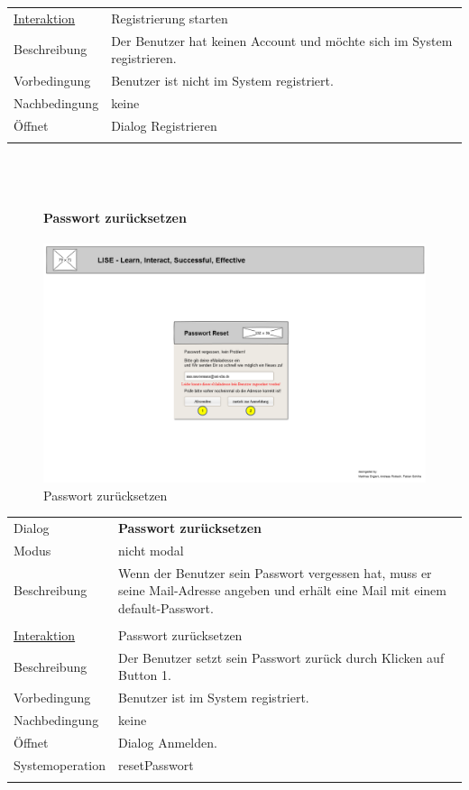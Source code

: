 \documentclass[12pt,a4paper]{article}
\begin{document}
{\begin{tabular}{l p{12cm}}
	\underline{Interaktion} 	 & Registrierung starten\\ 
	Beschreibung   	& Der Benutzer hat keinen Account und möchte sich im System registrieren.\\
	Vorbedingung	& Benutzer ist nicht im System registriert.\\
	Nachbedingung	& keine \\
	Öffnet			& Dialog \glqq Registrieren\grqq\\\\
\end{tabular}\\\\

\begin{figure}[H]
	\centering
	\paragraph{Passwort zurücksetzen}
	\includegraphics[width=\textwidth]{Bilder/Mockups/GUI/PasswortVergessen.png}
	\caption{Passwort zurücksetzen}
	\label{GuiPasswortVergessen}
\end{figure}
\begin{tabular}{l p{12cm}}
	Dialog 	 & \textbf{Passwort zurücksetzen} \\ 
	Modus & nicht modal\\ 
	Beschreibung   	& Wenn der Benutzer sein Passwort vergessen hat, muss er seine Mail-Adresse angeben und erhält eine Mail mit einem default-Passwort. \\\\
	
	\underline{Interaktion} 	 & Passwort zurücksetzen\\ 
	Beschreibung   	& Der Benutzer setzt sein Passwort zurück durch Klicken auf Button 1.\\
	Vorbedingung	& Benutzer ist im System registriert.\\
	Nachbedingung	& keine \\
	Öffnet			& Dialog \glqq Anmelden\grqq.\\
	Systemoperation & resetPasswort\\\\
\end{tabular}

}
\end{document}
